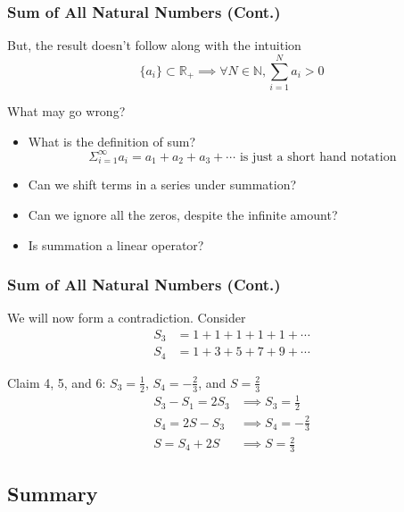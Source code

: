 \documentclass{beamer}
\begin{document}
\begin{frame}
\frametitle{Sum of All Natural Numbers (Cont.)}

But, the result doesn't follow along with the intuition 
$$ \{a_i\} \subset \mathbb{R}_{+} \implies \forall N \in \mathbb{N}, \sum_{i=1}^{N} a_i > 0 $$

What may go wrong? 
\begin{itemize}
    \item What is the definition of sum? 
    $$ \Sigma_{i=1}^{\infty} a_i = a_1 + a_2 + a_3 + \cdots \text{ is just a short hand notation} $$
    \item Can we shift terms in a series under summation? 
    \item Can we ignore all the zeros, despite the infinite amount? 
    \item Is summation a linear operator? 
\end{itemize}

\end{frame}


\begin{frame}
\frametitle{Sum of All Natural Numbers (Cont.)}

We will now form a contradiction. Consider 
\begin{align*}
    S_3 &= 1 + 1 + 1 + 1 + 1 + \cdots \\ 
    S_4 &= 1 + 3 + 5 + 7 + 9 + \cdots
\end{align*}

\begin{block}{Claim 4, 5, and 6: $ S_3 = \frac{1}{2} $, $ S_4 = -\frac{2}{3} $, and $S = \frac{2}{3} $}
\begin{align*}
    S_3 - S_1 = 2 S_3 &\implies S_3 = \frac{1}{2} \\
    S_4 = 2S - S_3    &\implies S_4 = -\frac{2}{3} \\ 
    S = S_4 + 2S      &\implies S   = \frac{2}{3} 
\end{align*}
\end{block}

\end{frame}


\subsection{Summary}
\end{document}
